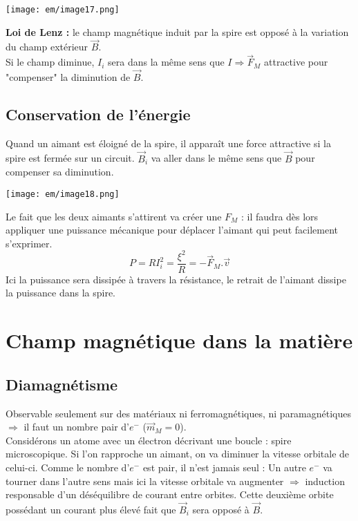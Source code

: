\documentclass[british,french,11pt, a4paper, openany]{book}
\begin{document}
\begin{center}
	\texttt{[image: em/image17.png]}\\
\end{center}
\textbf{Loi de Lenz :} le champ magnétique induit par la spire est opposé à la variation du champ extérieur $\vec{B}$.\\
Si le champ diminue, $I_i$ sera dans la même sens que $I \Rightarrow \vec{F}_M$ attractive pour "compenser" la diminution de $\vec{B}$.

\subsection{Conservation de l'énergie}
Quand un aimant est éloigné de la spire, il apparaît une force attractive si la spire est fermée sur un circuit. $\vec{B}_i$ va aller dans le même sens que $\vec{B}$ pour compenser sa diminution.
\begin{center}
	\texttt{[image: em/image18.png]}\\
\end{center}
Le fait que les deux aimants s'attirent va créer une $F_M$ : il faudra dès lors appliquer une puissance mécanique pour déplacer l'aimant qui peut facilement s'exprimer.
\begin{equation}
	P = RI_i^2 = \frac{\xi^2}{R} = -\vec{F}_M.\vec{v}
\end{equation}
Ici la puissance sera dissipée à travers la résistance, le retrait de l'aimant dissipe la puissance dans la spire.

\section{Champ magnétique dans la matière}
\subsection{Diamagnétisme}
Observable seulement sur des matériaux ni ferromagnétiques, ni paramagnétiques $\Rightarrow$ il faut un nombre pair d'$e^-$ ($\vec{m}_M = 0$).\\
Considérons un atome avec un électron décrivant une boucle : spire microscopique. Si l'on rapproche un aimant, on va diminuer la vitesse orbitale de celui-ci. Comme le nombre d'$e^-$ est pair, il n'est jamais seul : Un autre $e^-$ va tourner dans l'autre sens mais ici la vitesse orbitale va augmenter $\Rightarrow$ induction responsable d'un déséquilibre de courant entre orbites. Cette deuxième orbite possédant un courant plus élevé fait que $\vec{B}_i$ sera opposé à $\vec{B}$.\\
\end{document}

